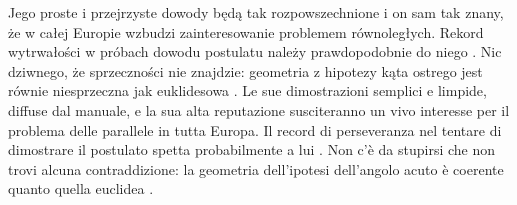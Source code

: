Jego proste i przejrzyste dowody będą tak rozpowszechnione i on sam tak znany, że w całej Europie wzbudzi zainteresowanie problemem równoległych. %
Rekord wytrwałości w próbach dowodu postulatu należy prawdopodobnie do niego \cite[s. 286]{eves1_1972}. %
Nic dziwnego, że sprzeczności nie znajdzie: geometria z hipotezy kąta ostrego jest równie niesprzeczna jak euklidesowa \cite[s. 286]{eves1_1972}. %
Le sue dimostrazioni semplici e limpide, diffuse dal manuale, e la sua alta reputazione susciteranno un vivo interesse per il problema delle parallele in tutta Europa. %
Il record di perseveranza nel tentare di dimostrare il postulato spetta probabilmente a lui \cite[p. 286]{eves1_1972}. %
Non c'è da stupirsi che non trovi alcuna contraddizione: la geometria dell'ipotesi dell'angolo acuto è coerente quanto quella euclidea \cite[p. 286]{eves1_1972}. %

